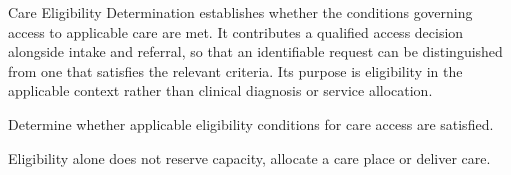 Care Eligibility Determination establishes whether the conditions governing access to applicable care are met. It contributes a qualified access decision alongside intake and referral, so that an identifiable request can be distinguished from one that satisfies the relevant criteria. Its purpose is eligibility in the applicable context rather than clinical diagnosis or service allocation.



Determine whether applicable eligibility conditions for care access are satisfied.



Eligibility alone does not reserve capacity, allocate a care place or deliver care.


